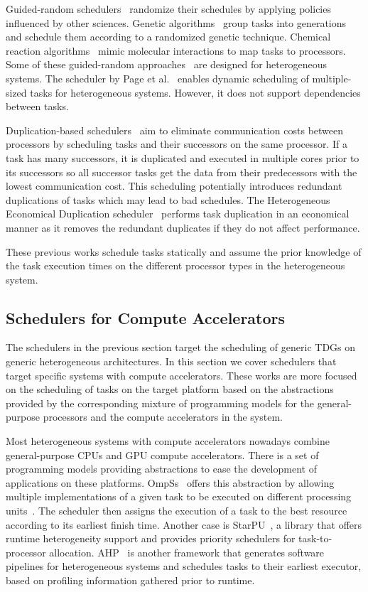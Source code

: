 Guided-random schedulers~\cite{Gen07, Chemical, Dyn05} randomize their schedules by applying policies influenced by other sciences. Genetic algorithms~\cite{Gen07} group tasks into generations and schedule them according to a randomized genetic technique. Chemical reaction algorithms~\cite{Chemical} mimic molecular interactions to map tasks to processors. Some of these guided-random approaches~\cite{Gen07, Chemical} are designed for heterogeneous systems. The scheduler by Page et al.~\cite{Dyn05} enables dynamic scheduling of multiple-sized tasks for heterogeneous systems. However, it does not support dependencies between tasks.

Duplication-based schedulers~\cite{Dup03, Dup11, Dup09} aim to eliminate communication costs between processors by scheduling tasks and their successors on the same processor. If a task has many successors, it is duplicated and executed in multiple cores prior to its successors so all successor tasks get the data from their predecessors with the lowest communication cost. This scheduling potentially introduces redundant duplications of tasks which may lead to bad schedules. The Heterogeneous Economical Duplication scheduler~\cite{Dup09} performs task duplication in an economical manner as it removes the redundant duplicates if they do not affect performance. 

These previous works schedule tasks statically and assume the prior knowledge of the task execution times on the different processor types in the heterogeneous system.

\subsection{Schedulers for Compute Accelerators}

The schedulers in the previous section target the scheduling of generic TDGs on generic heterogeneous architectures. In this section we cover schedulers that target specific systems with compute accelerators. These works are more focused on the scheduling of tasks on the target platform based on the abstractions provided by the corresponding mixture of programming models for the general-purpose processors and the compute accelerators in the system.

Most heterogeneous systems with compute accelerators nowadays combine general-purpose CPUs and GPU compute accelerators. There is a set of programming models providing abstractions to ease the development of applications on these platforms. OmpSs~\cite{OmpSs_PPL11, OmpSs} offers this abstraction by allowing multiple implementations of a given task to be executed on different processing units~\cite{Planas:IPDPS2013}. The scheduler then assigns the execution of a task to the best resource according to its earliest finish time. Another case is StarPU~\cite{starpu}, a library that offers runtime heterogeneity support and provides priority schedulers for task-to-processor allocation. AHP~\cite{AHP} is another framework that generates software pipelines for heterogeneous systems and schedules tasks to their earliest executor, based on profiling information gathered prior to runtime.

